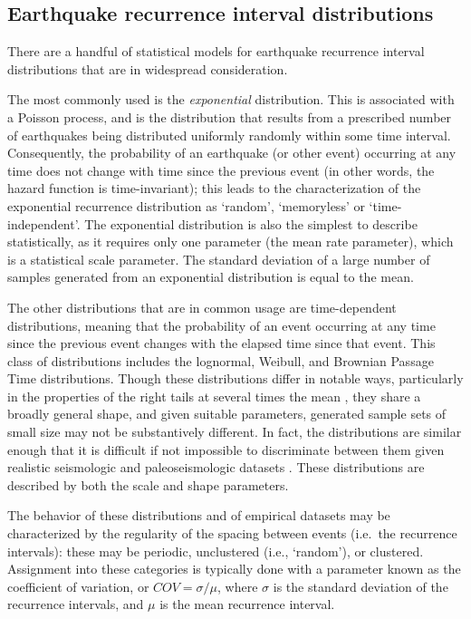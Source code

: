 \documentclass[se, manuscript]{copernicus}
\begin{document}
\subsection{Earthquake recurrence interval
distributions}\label{earthquake-recurrence-interval-distributions}

There are a handful of statistical models for earthquake recurrence
interval distributions that are in widespread consideration.

The most commonly used is the \emph{exponential} distribution. This is
associated with a Poisson process, and is the distribution that results
from a prescribed number of earthquakes being distributed uniformly
randomly within some time interval. Consequently, the probability of an
earthquake (or other event) occurring at any time does not change with
time since the previous event (in other words, the hazard function is
time-invariant); this leads to the characterization of the exponential
recurrence distribution as `random', `memoryless' or `time-independent'.
The exponential distribution is also the simplest to describe
statistically, as it requires only one parameter (the mean rate
parameter), which is a statistical scale parameter. The standard
deviation of a large number of samples generated from an exponential
distribution is equal to the mean.

The other distributions that are in common usage are time-dependent
distributions, meaning that the probability of an event occurring at any
time since the previous event changes with the elapsed time since that
event. This class of distributions includes the lognormal, Weibull, and
Brownian Passage Time \citep{matthews_brownian_2002} distributions.
Though these distributions differ in notable ways, particularly in the
properties of the right tails at several times the mean
\citep{davis_longer_1989,matthews_brownian_2002}, they share a broadly
general shape, and given suitable parameters, generated sample sets of
small size may not be substantively different. In fact, the
distributions are similar enough that it is difficult if not impossible
to discriminate between them given realistic seismologic and
paleoseismologic datasets
\citep{matthews_brownian_2002,ogata_estimating_1999}. These
distributions are described by both the scale and shape parameters.

The behavior of these distributions and of empirical datasets may be
characterized by the regularity of the spacing between events (i.e.~the
recurrence intervals): these may be periodic, unclustered (i.e.,
`random'), or clustered. Assignment into these categories is typically
done with a parameter known as the coefficient of variation, or
\(COV = \sigma / \mu\), where \(\sigma\) is the standard deviation of
the recurrence intervals, and \(\mu\) is the mean recurrence interval.
\end{document}
